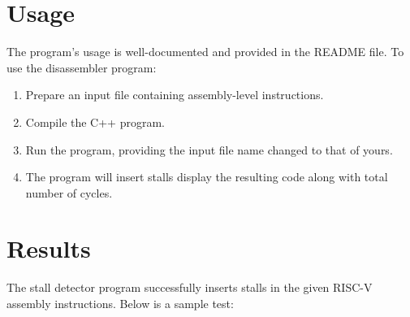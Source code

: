 \documentclass{article}
\begin{document}

\section{Usage}
The program's usage is well-documented and provided in the README file.
To use the disassembler program:

\begin{enumerate}
    \item Prepare an input file containing assembly-level instructions.
    \item Compile the C++ program.
    \item Run the program, providing the input file name changed to that of yours.
    \item The program will insert stalls display the resulting code along with total number of cycles.
\end{enumerate}

\section{Results}
The stall detector program successfully inserts stalls in the given RISC-V assembly instructions. Below is a sample test:
\end{document}
